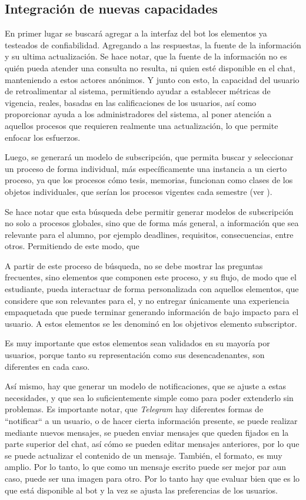 \documentclass[guia]{upropuesta}
\begin{document}
    \subsection{Integración de nuevas capacidades}
    \par En primer lugar se buscará agregar a la interfaz del bot los elementos ya testeados de confiabilidad. Agregando a las respuestas, la fuente de la información y su ultima actualización. Se hace notar, que la fuente de la información no es quién pueda atender una consulta no resulta, ni quien esté disponible en el chat, manteniendo a estos actores anónimos. Y junto con esto, la capacidad del usuario de retroalimentar al sistema, permitiendo ayudar a establecer métricas de vigencia, reales, basadas en las calificaciones de los usuarios, así como proporcionar ayuda a los administradores del sistema, al poner atención a aquellos procesos que requieren realmente una actualización, lo que permite enfocar los esfuerzos.
    \par Luego, se generará un modelo de subscripción, que permita buscar y seleccionar un proceso de forma individual, más específicamente una instancia a un cierto proceso, ya que los procesos cómo tesis, memorias, funcionan como clases de los objetos individuales, que serían los procesos vigentes cada semestre (ver \cite{ARANCIBIA2021}). 
    \par Se hace notar que esta búsqueda debe permitir generar modelos de subscripción no solo a procesos globales, sino que de forma más general, a información que sea relevante para el alumno, por ejemplo deadlines, requisitos, consecuencias, entre otros. Permitiendo de este modo, que
    \par A partir de este proceso de búsqueda, no se debe mostrar las preguntas frecuentes, sino elementos que componen este proceso, y su flujo, de modo que el estudiante, pueda interactuar de forma personalizada con aquellos elementos, que considere que son relevantes para el, y no entregar únicamente una experiencia empaquetada que puede terminar generando información de bajo impacto para el usuario. A estos elementos se les denominó en los objetivos elemento subscriptor.
    \par Es muy importante que estos elementos sean validados en su mayoría por usuarios, porque tanto su representación como sus desencadenantes, son diferentes en cada caso.
    \par Así mismo, hay que generar un modelo de notificaciones, que se ajuste a estas necesidades, y que sea lo suficientemente simple como para poder extenderlo sin problemas. Es importante notar, que \textit{Telegram} hay diferentes formas de ``notificar`` a un usuario, o de hacer cierta información presente, se puede realizar mediante nuevos mensajes, se pueden enviar mensajes que queden fijados en la parte superior del chat, así cómo se pueden editar mensajes anteriores, por lo que se puede actualizar el contenido de un mensaje. También, el formato, es muy amplio. Por lo tanto, lo que como un mensaje escrito puede ser mejor par aun caso, puede ser una imagen para otro. Por lo tanto hay que evaluar bien que es lo que está disponible al bot y la vez se ajusta las preferencias de los usuarios.
\end{document}
